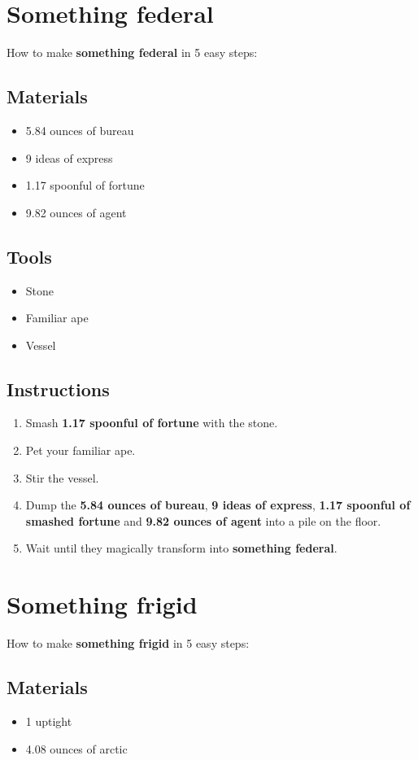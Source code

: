 \documentclass{article}
\begin{document}
\section{Something federal}How to make \textbf{something federal} in 5 easy steps:

\subsection{Materials}\begin{itemize}
\item 
5.84 ounces of bureau
\item 
9 ideas of express
\item 
1.17 spoonful of fortune
\item 
9.82 ounces of agent
\end{itemize}
\subsection{Tools}\begin{itemize}
\item 
Stone
\item 
Familiar ape
\item 
Vessel
\end{itemize}
\subsection{Instructions}\begin{enumerate}
\item 
Smash \textbf{1.17 spoonful of fortune} with the stone.
\item 
Pet your familiar ape.
\item 
Stir the vessel.
\item 
Dump the \textbf{5.84 ounces of bureau}, \textbf{9 ideas of express}, \textbf{1.17 spoonful of smashed fortune} and \textbf{9.82 ounces of agent} into a pile on the floor.
\item 
Wait until they magically transform into \textbf{something federal}.
\end{enumerate}
\newpage
\section{Something frigid}How to make \textbf{something frigid} in 5 easy steps:

\subsection{Materials}\begin{itemize}
\item 
1 uptight
\item 
4.08 ounces of arctic
\end{itemize}
\end{document}
